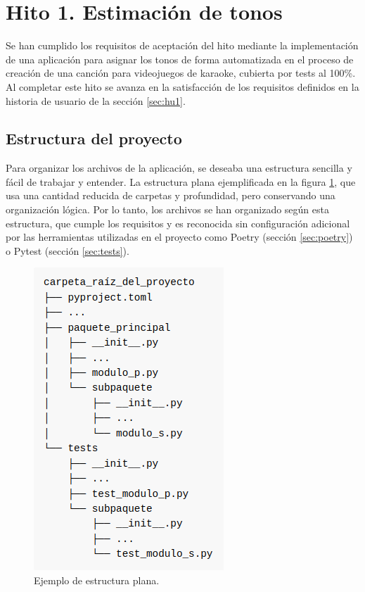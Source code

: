 \section{Hito 1. Estimación de tonos}

Se han cumplido los requisitos de aceptación del hito mediante la implementación de una aplicación para asignar los tonos de forma automatizada en el proceso de creación de una canción para videojuegos de karaoke, cubierta por tests al 100\%. Al completar este hito se avanza en la satisfacción de los requisitos definidos en la historia de usuario de la sección \ref{sec:hu1}.

\subsection{Estructura del proyecto}
Para organizar los archivos de la aplicación, se deseaba una estructura sencilla y fácil de trabajar y  entender.  La estructura plana ejemplificada en la figura \ref{fig:layout1}, que usa una cantidad reducida de carpetas y profundidad, pero conservando una organización lógica.  Por lo tanto, los archivos se han organizado según esta estructura, que cumple los requisitos y es reconocida sin configuración adicional por las herramientas utilizadas en el proyecto como Poetry (sección \ref{sec:poetry}) o Pytest (sección \ref{sec:tests}).

\begin{figure}[h]
	\centering
	\includegraphics[width=0.5\linewidth]{logos/layout.png}
	\caption{Ejemplo de estructura plana.}
	\label{fig:layout1}
\end{figure}


